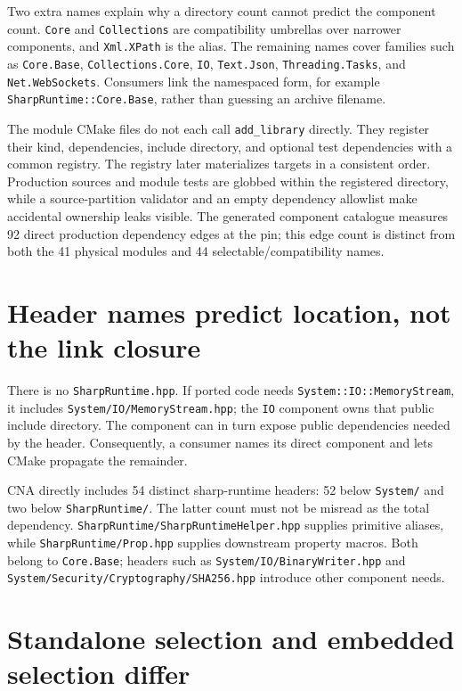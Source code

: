 Two extra names explain why a directory count cannot predict the component count.
\texttt{Core} and \texttt{Collections} are compatibility umbrellas over narrower components,
and \texttt{Xml.XPath} is the alias. The remaining names cover families such as
\texttt{Core.Base}, \texttt{Collections.Core}, \texttt{IO}, \texttt{Text.Json},
\texttt{Threading.Tasks}, and \texttt{Net.WebSockets}. Consumers link the namespaced form,
for example \texttt{SharpRuntime::Core.Base}, rather than guessing an archive filename.

The module CMake files do not each call \texttt{add\_library} directly. They register their
kind, dependencies, include directory, and optional test dependencies with a common registry.
The registry later materializes targets in a consistent order. Production sources and module
tests are globbed within the registered directory, while a source-partition validator and an
empty dependency allowlist make accidental ownership leaks visible. The generated component
catalogue measures 92 direct production dependency edges at the pin; this edge count is distinct
from both the 41 physical modules and 44 selectable/compatibility names.

\section{Header names predict location, not the link closure}

There is no \texttt{SharpRuntime.hpp}. If ported code needs
\texttt{System::IO::MemoryStream}, it includes
\texttt{System/IO/MemoryStream.hpp}; the \texttt{IO} component owns that public include
directory. The component can in turn expose public dependencies needed by the header.
Consequently, a consumer names its direct component and lets CMake propagate the remainder.

CNA directly includes 54 distinct sharp-runtime headers: 52 below \texttt{System/} and two
below \texttt{SharpRuntime/}. The latter count must not be misread as the total dependency.
\texttt{SharpRuntime/\allowbreak SharpRuntimeHelper.hpp} supplies primitive aliases, while
\texttt{SharpRuntime/\allowbreak Prop.hpp} supplies downstream property macros. Both belong
to \texttt{Core.Base}; headers such as
\texttt{System/IO/\allowbreak BinaryWriter.hpp} and
\texttt{System/Security/\allowbreak Cryptography/\allowbreak SHA256.hpp} introduce other
component needs.

\section{Standalone selection and embedded selection differ}

